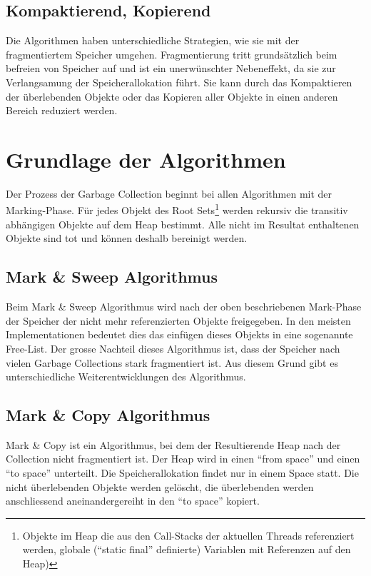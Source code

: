 \subsection{Kompaktierend, Kopierend}
Die Algorithmen haben unterschiedliche Strategien, wie sie mit der fragmentiertem Speicher umgehen. Fragmentierung tritt grundsätzlich beim befreien von Speicher auf und ist ein unerwünschter Nebeneffekt, da sie zur Verlangsamung der Speicherallokation führt. Sie kann durch das Kompaktieren der überlebenden Objekte oder das Kopieren aller Objekte in einen anderen Bereich reduziert werden.

\section{Grundlage der Algorithmen}
Der Prozess der Garbage Collection beginnt bei allen Algorithmen mit der Marking-Phase. Für jedes Objekt des Root Sets\footnote{Objekte im Heap die aus den Call-Stacks der aktuellen Threads referenziert werden, globale (``static final'' definierte) Variablen mit Referenzen auf den Heap)} werden rekursiv die transitiv abhängigen Objekte auf dem Heap bestimmt. Alle nicht im Resultat enthaltenen Objekte sind tot und können deshalb bereinigt werden.

\subsection{Mark \& Sweep Algorithmus}
Beim Mark \& Sweep Algorithmus wird nach der oben beschriebenen Mark-Phase der Speicher der nicht mehr referenzierten Objekte freigegeben. In den meisten Implementationen bedeutet dies das einfügen dieses Objekts in eine sogenannte Free-List. Der grosse Nachteil dieses Algorithmus ist, dass der Speicher nach vielen Garbage Collections stark fragmentiert ist. Aus diesem Grund gibt es unterschiedliche Weiterentwicklungen des Algorithmus.

\subsection{Mark \& Copy Algorithmus}
Mark \& Copy ist ein Algorithmus, bei dem der Resultierende Heap nach der Collection nicht fragmentiert ist. Der Heap wird in einen ``from space'' und einen ``to space'' unterteilt. Die Speicherallokation findet nur in einem Space statt. Die nicht überlebenden Objekte werden gelöscht, die überlebenden werden anschliessend aneinandergereiht in den ``to space'' kopiert.

